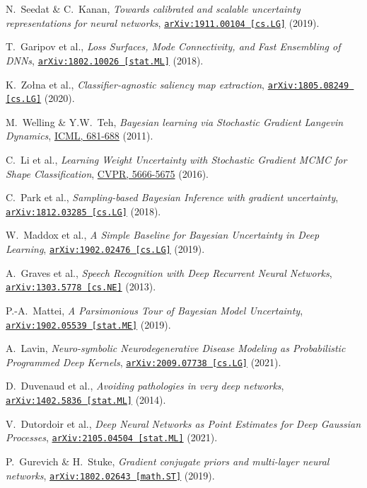\documentclass{article}
\begin{document}
\begin{thebibliography}{11}
    N.~Seedat \& C.~Kanan,
    \textit{Towards calibrated and scalable uncertainty representations for neural networks},
    \href{https://arxiv.org/abs/1911.00104}{\texttt{arXiv:1911.00104 [cs.LG]}} (2019).

    T.~Garipov et al.,
    \textit{Loss Surfaces, Mode Connectivity, and Fast Ensembling of DNNs},
    \href{https://arxiv.org/abs/1802.10026}{\texttt{arXiv:1802.10026 [stat.ML]}} (2018).

    K.~Zołna et al.,
    \textit{Classifier-agnostic saliency map extraction},
    \href{https://arxiv.org/abs/1805.08249}{\texttt{arXiv:1805.08249 [cs.LG]}} (2020).

    M.~Welling \& Y.W.~Teh,
    \textit{Bayesian learning via Stochastic Gradient Langevin Dynamics},
    \href{https://dl.acm.org/doi/10.5555/3104482.3104568}{ICML, 681-688} (2011).

    C.~Li et al.,
    \textit{Learning Weight Uncertainty with Stochastic Gradient MCMC for Shape Classification},
    \href{https://doi.org/10.1109/CVPR.2016.611}{CVPR, 5666-5675} (2016).

    C.~Park et al.,
    \textit{Sampling-based Bayesian Inference with gradient uncertainty},
    \href{https://arxiv.org/abs/1812.03285}{\texttt{arXiv:1812.03285 [cs.LG]}} (2018).

    W.~Maddox et al.,
    \textit{A Simple Baseline for Bayesian Uncertainty in Deep Learning},
    \href{https://arxiv.org/abs/1902.02476}{\texttt{arXiv:1902.02476 [cs.LG]}} (2019).

    A.~Graves et al.,
    \textit{Speech Recognition with Deep Recurrent Neural Networks},
    \href{https://arxiv.org/abs/1303.5778}{\texttt{arXiv:1303.5778 [cs.NE]}} (2013).

    P.-A.~Mattei,
    \textit{A Parsimonious Tour of Bayesian Model Uncertainty},
    \href{https://arxiv.org/abs/1902.05539}{\texttt{arXiv:1902.05539 [stat.ME]}} (2019).

    A.~Lavin,
    \textit{Neuro-symbolic Neurodegenerative Disease Modeling as Probabilistic Programmed Deep Kernels},
    \href{https://arxiv.org/abs/2009.07738}{\texttt{arXiv:2009.07738 [cs.LG]}} (2021).

    D.~Duvenaud et al., 
    \textit{Avoiding pathologies in very deep networks},
    \href{https://arxiv.org/abs/1402.5836}{\texttt{arXiv:1402.5836 [stat.ML]}} (2014).

    V.~Dutordoir et al.,
    \textit{Deep Neural Networks as Point Estimates for Deep Gaussian Processes},
    \href{https://arxiv.org/abs/2105.04504}{\texttt{arXiv:2105.04504 [stat.ML]}} (2021).

    P.~Gurevich \& H.~Stuke,
    \textit{Gradient conjugate priors and multi-layer neural networks},
    \href{https://arxiv.org/abs/1802.02643}{\texttt{arXiv:1802.02643 [math.ST]}} (2019).
\end{thebibliography}
\end{document}
